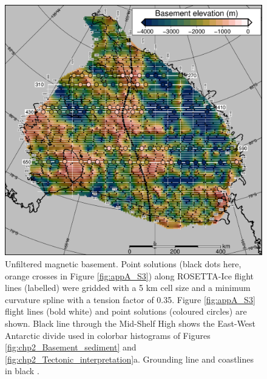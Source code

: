 \begin{figure}[!ht]
    \centering
    \includegraphics[width=.95\textwidth]{figures/chp2/figure_S4.png}
    \caption[Unfiltered magnetic basement and point solutions]{Unfiltered magnetic basement. Point solutions (black dots here, orange crosses in Figure \ref{fig:appA_S3}) along ROSETTA-Ice flight lines (labelled) were gridded with a 5 km cell size and a minimum curvature spline with a tension factor of 0.35. Figure \ref{fig:appA_S3} flight lines (bold white) and point solutions (coloured circles) are shown. Black line through the Mid-Shelf High shows the East-West Antarctic divide used in colorbar histograms of Figures \ref{fig:chp2_Basement_sediment} and \ref{fig:chp2_Tectonic_interpretation}a. Grounding line and coastlines in black \citep{rignoticeshelf2013}.}
    \label{fig:appA_S4}
\end{figure}

